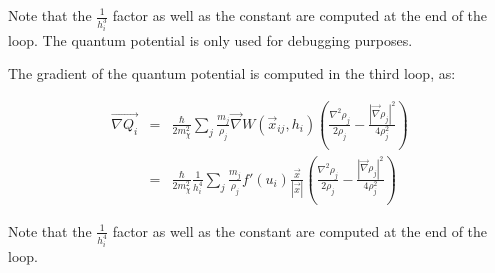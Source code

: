 Note that the  $\frac{1}{h_i^3}$ factor as well as the constant are computed at the end of the loop. The quantum potential is only
used for debugging purposes.

The gradient of the quantum potential is computed in the third loop, as:

\begin{eqnarray}
  \label{eq:uldm:implementation:grad_Q}
  \vec{\nabla{Q_i}}
  & = &  \frac{\hbar}{2 m^2_\chi }  \sum_j \frac{m_j}{\rho_j}\vec{\nabla} W(\vec{x}_{ij}, h_i)
  \left( \frac{\nabla^2\rho_j}{2\rho_j} -\frac{|\vec{\nabla}\rho_j|^2}{4\rho^2_j} \right)\\
  & = &  \frac{\hbar}{2 m^2_\chi } \frac{1}{h_i^4}
         \sum_j \frac{m_j}{\rho_j} f'(u_i) \frac{\vec{x}}{|\vec{x}|}
         \left( \frac{\nabla^2\rho_j}{2\rho_j} -\frac{|\vec{\nabla}\rho_j|^2}{4\rho^2_j} \right)
\end{eqnarray}

Note that the  $\frac{1}{h_i^4}$ factor as well as the constant are computed at the end of the loop.






